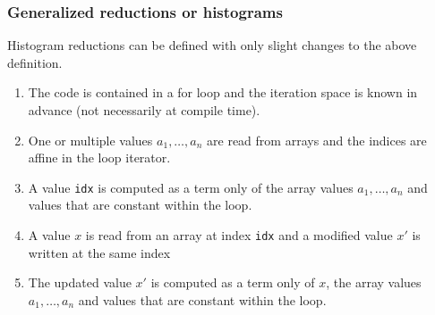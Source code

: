 \subsubsection{Generalized reductions or histograms}
Histogram reductions can be defined with only slight changes to the above definition.
\begin{enumerate}
\item The code is contained in a for loop and the iteration space is known in advance (not necessarily at compile time).
\item One or multiple values $a_1,\dots,a_n$ are read from arrays and the indices are affine in the loop iterator.
\item A value {\tt idx} is computed as a term only of the array values $a_1,\dots,a_n$ and values that are constant within the loop.
\item A value $x$ is read from an array at index {\tt idx} and a modified value $x'$ is written at the same index
\item The updated value $x'$ is computed as a term only of $x$, the array values $a_1,\dots,a_n$ and values that are constant within the loop.
\end{enumerate}


